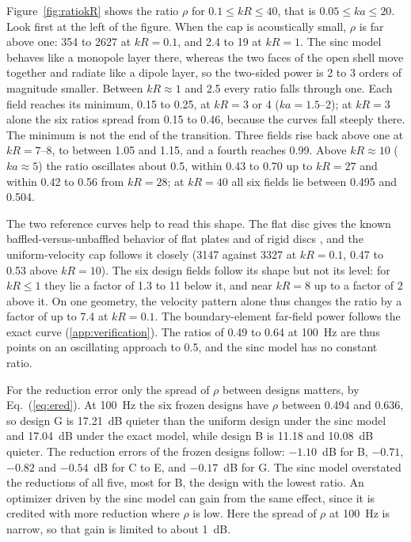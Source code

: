 \documentclass[preprint,12pt]{elsarticle}
\begin{document}
Figure~\ref{fig:ratiokR} shows the ratio $\rho$ for $0.1\le kR\le40$, that is $0.05\le ka\le20$. Look first at the left of the figure. When the cap is acoustically small, $\rho$ is far above one: 354 to 2627 at $kR=0.1$, and 2.4 to 19 at $kR=1$. %
The sinc model behaves like a monopole layer there, whereas the two faces of the open shell move together and radiate like a dipole layer, so the two-sided power is 2 to 3 orders of magnitude smaller. Between $kR\approx1$ and 2.5 every ratio falls through one. %
Each field reaches its minimum, 0.15 to 0.25, at $kR=3$ or 4 ($ka=1.5$--2); at $kR=3$ alone the six ratios spread from 0.15 to 0.46, because the curves fall steeply there. %
The minimum is not the end of the transition. Three fields rise back above one at $kR=7$--8, to between 1.05 and 1.15, and a fourth reaches 0.99. %
Above $kR\approx10$ ($ka\approx5$) the ratio oscillates about 0.5, within 0.43 to 0.70 up to $kR=27$ and within 0.42 to 0.56 from $kR=28$; at $kR=40$ all six fields lie between 0.495 and 0.504. %

The two reference curves help to read this shape. The flat disc gives the known baffled-versus-unbaffled behavior of flat plates \cite{Laulagnet1998,Nelisse1998} and of rigid discs \cite{MellowKarkkainen2024}, and the uniform-velocity cap follows it closely (3147 against 3327 at $kR=0.1$, 0.47 to 0.53 above $kR=10$). The six design fields follow its shape but not its level: for $kR\le1$ they lie a factor of 1.3 to 11 below it, and near $kR=8$ up to a factor of 2 above it. On one geometry, the velocity pattern alone thus changes the ratio by a factor of up to 7.4 at $kR=0.1$. %
The boundary-element far-field power follows the exact curve (\ref{app:verification}). The ratios of 0.49 to 0.64 at 100~Hz are thus points on an oscillating approach to 0.5, and the sinc model has no constant ratio. %

For the reduction error only the spread of $\rho$ between designs matters, by Eq.~(\ref{eq:ered}). At 100~Hz the six frozen designs have $\rho$ between 0.494 and 0.636, so design G is 17.21~dB quieter than the uniform design under the sinc model and 17.04~dB under the exact model, while design B is 11.18 and 10.08~dB quieter. %
The reduction errors of the frozen designs follow: $-1.10$~dB for B, $-0.71$, $-0.82$ and $-0.54$~dB for C to E, and $-0.17$~dB for G. The sinc model overstated the reductions of all five, most for B, the design with the lowest ratio. %
An optimizer driven by the sinc model can gain from the same effect, since it is credited with more reduction where $\rho$ is low. Here the spread of $\rho$ at 100~Hz is narrow, so that gain is limited to about 1~dB.
\end{document}
